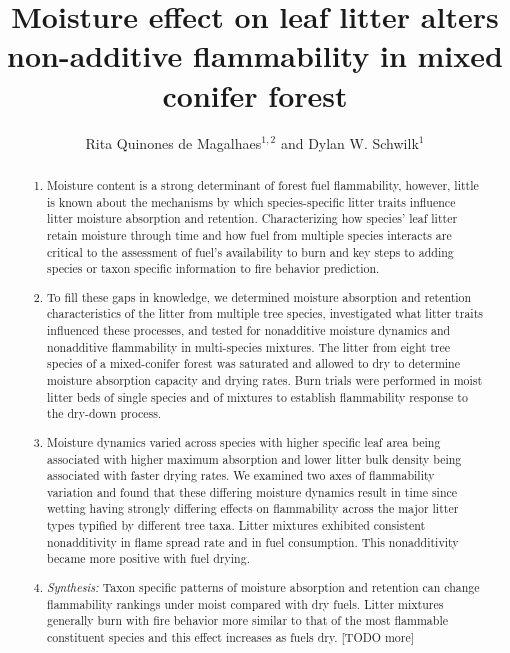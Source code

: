 \documentclass[letterpaper,12pt]{article}
\title{Moisture effect on leaf litter alters non-additive flammability in mixed conifer forest}
\author{Rita Quinones de Magalhaes$^{1,2}$ and Dylan W. Schwilk$^1$}
\begin{document}
\maketitle

\begin{abstract}
  \noindent \begin{enumerate}
    
      \item Moisture content is a strong determinant of forest fuel
    flammability, however, little is known about the mechanisms by which
    species-specific litter traits influence litter moisture absorption and
    retention. Characterizing how species’ leaf litter retain moisture through
    time and how fuel from multiple species interacts are critical to the
    assessment of fuel’s availability to burn and key steps to adding species
    or taxon specific information to fire behavior prediction.

      \item To fill these gaps in knowledge, we determined
    moisture absorption and retention characteristics of the litter from
    multiple tree species, investigated what litter traits influenced these
    processes, and tested for nonadditive moisture dynamics and nonadditive
    flammability in multi-species mixtures. The litter from eight tree species of a
    mixed-conifer forest was saturated and allowed to dry to determine moisture
    absorption capacity and drying rates. Burn trials were performed in moist
    litter beds of single species and of mixtures to establish flammability
    response to the dry-down process.
    
      \item Moisture dynamics varied across species with higher specific leaf
    area being associated with higher maximum absorption and lower litter bulk
    density being associated with faster drying rates. We examined two axes of
    flammability variation and found that these differing moisture dynamics
    result in time since wetting having strongly differing effects on
    flammability across the major litter types typified by different tree taxa.
    Litter mixtures exhibited consistent nonadditivity in flame spread rate and
    in fuel consumption. This nonadditivity became more positive with fuel
    drying.
    
      \item \emph{Synthesis:} Taxon specific patterns of moisture absorption
    and retention can change flammability rankings under moist compared with dry fuels.
    Litter mixtures generally burn with fire behavior more similar to that of
    the most flammable constituent species and this effect increases as fuels
    dry. [TODO more]
    
  \end{enumerate}
\end{abstract}
\end{document}
